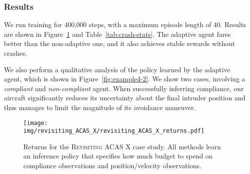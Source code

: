 \subsubsection{Results}
We run training for 400,000 steps, with a maximum episode length of 40. Results are shown in Figure~\ref{fig:example4-1} and Table~\ref{tab:crash-stats}. The adaptive agent fares better than the non-adaptive one, and it also achieves stable rewards without crashes.

We also perform a qualitative analysis of the policy learned by the adaptive agent, which is shown in Figure~\ref{fig:example4-2}. We show two cases, involving a \emph{compliant} and \emph{non-compliant} agent. When successfully inferring compliance, our aircraft significantly reduces its uncertainty about the final intruder position and thus manages to limit the magnitude of its avoidance maneuver.

\begin{figure}
    \centering
    \texttt{[image: img/revisiting\_ACAS\_X/revisiting\_ACAS\_X\_returns.pdf]}
    \caption{Returns for the \textsc{Revisiting ACAS X} case study. All methods learn an inference policy that specifies how much budget to spend on compliance observations and position/velocity observations.}
    \label{fig:example4-1}
    \Description[]{}
\end{figure}
